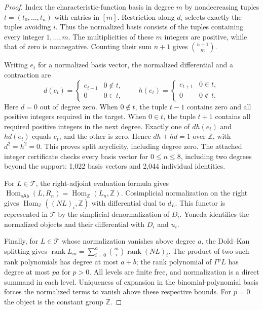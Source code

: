 \begin{proof}
Index the characteristic-function basis in degree $m$ by
nondecreasing tuples $t=(t_0,\ldots,t_n)$ with entries in $[m]$.
Restriction along $d_i$ selects exactly the tuples avoiding $i$.
Thus the normalized basis consists of the tuples containing every
integer $1,\ldots,m$.  The multiplicities of these $m$ integers are
positive, while that of zero is nonnegative.  Counting their sum
$n+1$ gives $\binom{n+1}{m}$.

Writing $e_t$ for a normalized basis vector, the normalized
differential and a contraction are
\[
 d(e_t)=
 \begin{cases}e_{t-1}&0\notin t,\\0&0\in t,\end{cases}
 \qquad
 h(e_t)=
 \begin{cases}e_{t+1}&0\in t,\\0&0\notin t.\end{cases}
 \tag{S09.2}
\]
Here $d=0$ out of degree zero.  When $0\notin t$, the tuple $t-1$
contains zero and all positive integers required in the target.
When $0\in t$, the tuple $t+1$ contains all required positive
integers in the next degree.  Exactly one of $dh(e_t)$ and $hd(e_t)$
equals $e_t$, and the other is zero.  Hence $dh+hd=1$ over
$\mathbb Z$, with $d^2=h^2=0$.  This proves split acyclicity,
including degree zero.  The attached integer certificate checks
every basis vector for $0\leq n\leq8$, including two degrees beyond
the support: 1,022 basis vectors and 2,044 individual identities.

For $L\in\mathcal T$, the right-adjoint evaluation formula gives
$\operatorname{Hom}_{s\mathsf{Ab}}(L,R_n)
=\operatorname{Hom}_{\mathbb Z}(L_n,\mathbb Z)$.
Cosimplicial normalization on the right gives
$\operatorname{Hom}_{\mathbb Z}((NL)_i,\mathbb Z)$ with differential
dual to $d_L$.  This functor is represented in $\mathcal T$ by the
simplicial denormalization of $D_i$.  Yoneda identifies the normalized
objects and their differential with $D_i$ and $u_i$.

Finally, for $L\in\mathcal T$ whose normalization vanishes above
degree $a$, the Dold--Kan splitting gives
$\operatorname{rank}L_m=\sum_{i=0}^{a}\binom mi
\operatorname{rank}(NL)_i$.
The product of two such rank polynomials has degree at most $a+b$;
the rank polynomial of $\Gamma^pL$ has degree at most $pa$ for $p>0$.
All levels are finite free, and normalization is a direct summand in
each level.  Uniqueness of expansion in the binomial-polynomial basis
forces the normalized terms to vanish above these respective bounds.
For $p=0$ the object is the constant group $\mathbb Z$.
\end{proof}


